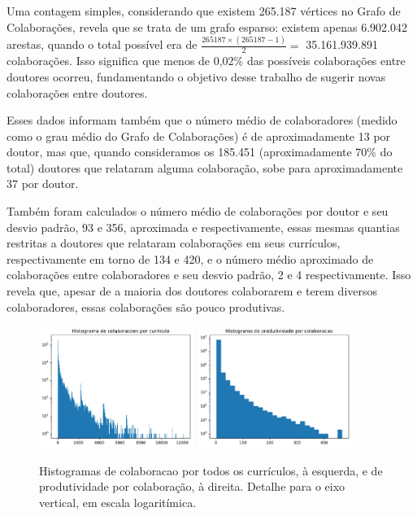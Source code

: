 \documentclass[12pt]{article}
\begin{document}
Uma contagem simples, considerando que existem 265.187 vértices no Grafo de Colaborações, revela que se trata de um grafo esparso: existem apenas 6.902.042 arestas, quando o total possível era de $\frac{265187 \times (265187 - 1)}{2} =$ 35.161.939.891 colaborações.
Isso significa que menos de 0,02\% das possíveis colaborações entre doutores ocorreu, fundamentando o objetivo desse trabalho de sugerir novas colaborações entre doutores.

Esses dados informam também que o número médio de colaboradores (medido como o grau médio do Grafo de Colaborações) é de aproximadamente 13 por doutor, mas que, quando consideramos os 185.451 (aproximadamente 70\% do total) doutores que relataram alguma colaboração, sobe para aproximadamente 37 por doutor.

Também foram calculados o número médio de colaborações por doutor e seu desvio padrão, 93 e 356, aproximada e respectivamente, essas mesmas quantias restritas a doutores que relataram colaborações em seus currículos, respectivamente em torno de 134 e 420, e o número médio aproximado de colaborações entre colaboradores e seu desvio padrão, 2 e 4 respectivamente.
Isso revela que, apesar de a maioria dos doutores colaborarem e terem diversos colaboradores, essas colaborações são pouco produtivas.

\begin{figure}
\centering
  \includegraphics[width=0.45\textwidth]{graphs/degree_histogram.pdf}
  \includegraphics[width=0.45\textwidth]{graphs/weight_histogram.pdf}
  \caption{Histogramas de colaboracao por todos os currículos, à esquerda, e de produtividade por colaboração, à direita. Detalhe para o eixo vertical, em escala logaritímica.}
  \label{fig:collabs}
\end{figure}
\end{document}
